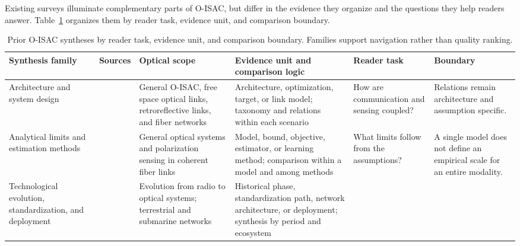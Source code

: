 Existing surveys illuminate complementary parts of O-ISAC, but differ in the
evidence they organize and the questions they help readers answer.
Table~\ref{tab:prior_surveys} organizes them by reader task, evidence unit, and
comparison boundary.

\begin{table}[!t]
\caption{Prior O-ISAC syntheses by reader task, evidence unit, and comparison
boundary. Families support navigation rather than quality ranking.}
\label{tab:prior_surveys}
\centering
\begingroup
\footnotesize
\setlength{\tabcolsep}{2.2pt}
\renewcommand{\arraystretch}{1.00}
\begin{tabularx}{\textwidth}{@{}%
>{\raggedright\arraybackslash}p{}
>{\raggedright\arraybackslash}p{}
>{\raggedright\arraybackslash}p{}
>{\raggedright\arraybackslash}p{}
>{\raggedright\arraybackslash}p{}
>{\raggedright\arraybackslash}X@{}}
\toprule
Synthesis family & Sources & Optical scope & Evidence unit and comparison logic &
Reader task & Boundary \\
\midrule
Architecture and system design &
\cite{Wen2024OISACArchitectures,Su2025OISACTheoryPractice,
Chu2025ROISACOverview,Wang2026CrossLayerISACoF} &
General O-ISAC, free space optical links, retroreflective links, and fiber
networks &
Architecture, optimization, target, or link model; taxonomy and relations
within each scenario &
How are communication and sensing coupled? &
Relations remain architecture and assumption specific. \\
\addlinespace[1pt]
Analytical limits and estimation methods &
\cite{Khorasgani2026GeneralOpticalISACSurvey,Rode2025PolarizationISAC} &
General optical systems and polarization sensing in coherent fiber links &
Model, bound, objective, estimator, or learning method; comparison within a
model and among methods &
What limits follow from the assumptions? &
A single model does not define an empirical scale for an entire modality. \\
\addlinespace[1pt]
Technological evolution, standardization, and deployment &
\cite{Zhang2026ISACEvolution,Liu2025OpticalNetworkISACProspect,
Cao2026SubmarineFiberISAC,Zhang2026OpticalTransmissionNetworks,
Ip2026DeployedTelecomCableISAC} &
Evolution from radio to optical systems; terrestrial and submarine networks &
Historical phase, standardization path, network architecture, or deployment;
synthesis by period and ecosystem &

\end{tabularx}
\end{table}
